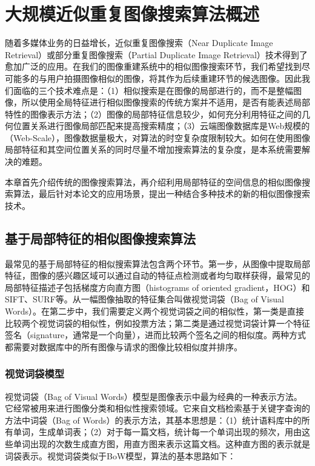 

\chapter{大规模近似重复图像搜索算法概述}

随着多媒体业务的日益增长，近似重复图像搜索（Near Duplicate Image Retrieval）或部分重复图像搜索（Partial Duplicate Image Retrieval）技术得到了愈加广泛的应用。在我们的图像重建系统中的相似图像搜索环节，我们希望找到尽可能多的与用户拍摄图像相似的图像，将其作为后续重建环节的候选图像。因此我们面临的三个技术难点是：（1）相似搜索是在图像的局部进行的，而不是整幅图像，所以使用全局特征进行相似图像搜索的传统方案并不适用，是否有能表述局部特性的图像表示方法；（2）图像的局部特征信息较少，如何充分利用特征之间的几何位置关系进行图像局部匹配来提高搜索精度；（3）云端图像数据库是Web规模的（Web-Scale），图像数据量极大，对算法的时空复杂度限制较大。如何在使用图像局部特征和其空间位置关系的同时尽量不增加搜索算法的复杂度，是本系统需要解决的难题。

本章首先介绍传统的图像搜索算法，再介绍利用局部特征的空间信息的相似图像搜索算法，最后针对本论文的应用场景，提出一种结合多种技术的新的相似图像搜索技术。

\section{基于局部特征的相似图像搜索算法}

最常见的基于局部特征的相似搜索算法包含两个环节。第一步，从图像中提取局部特征，图像的感兴趣区域可以通过自动的特征点检测或者均匀取样获得，最常见的局部特征描述子包括梯度方向直方图（histograms of oriented gradient，HOG）和SIFT、SURF等。从一幅图像抽取的特征集合叫做视觉词袋（Bag of Visual Words）。在第二步中，我们需要定义两个视觉词袋之间的相似性，第一类是直接比较两个视觉词袋的相似性，例如投票方法；第二类是通过视觉词袋计算一个特征签名（signature，通常是一个向量），进而比较两个签名之间的相似度。两种方式都需要对数据库中的所有图像与请求的图像比较相似度并排序\cite{POLICY:2013te}。

\subsection{视觉词袋模型}
视觉词袋（Bag of Visual Words）模型是图像表示中最为经典的一种表示方法。它经常被用来进行图像分类和相似性搜索领域。它来自文档检索基于关键字查询的方法中词袋（Bag of Words）的表示方法，其基本思想是：（1）统计语料库中的所有单词，生成单词表；（2）对于每一篇文档，统计每一个单词出现的频次，用由这些单词出现的次数生成直方图，用直方图来表示这篇文档。这种直方图的表示就是词袋表示。视觉词袋类似于BoW模型，算法的基本思路如下：

